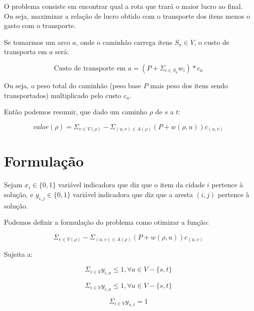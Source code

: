 \documentclass[conference]{IEEEtran}
\begin{document}
    O problema consiste em encontrar qual a rota que trará o maior lucro ao final. Ou seja, maximizar a relação de lucro obtido com o transporte dos itens menos o gasto com o transporte.

    Se tomarmos um arco $a$, onde o caminhão carrega itens $S_a \in V$, o custo de transporta em $a$ será:

    \begin{equation}
        \text{Custo de transporte em } a = (P + \Sigma_{i \in S_a} w_i) * c_a
    \end{equation}

    Ou seja, o peso total do caminhão (peso base $P$ mais peso dos itens sendo transportados) multiplicado pelo custo $c_a$.

    Então podemos resumir, que dado um caminho $\rho$ de $s$ a $t$:

    \begin{equation}
        valor(\rho) = \Sigma_{v \in V(\rho)} - \Sigma_{(u,v) \in A(\rho)} (P + w(\rho, u))c_{(u,v)}
    \end{equation}

\section {Formulação}

    Sejam $x_i \in \{0, 1\}$ variável indicadora que diz que o item da cidade $i$ pertence à solução, e $y_{i,j} \in \{0, 1\}$ variável indicadora que diz que a aresta $(i,j)$ pertence à solução.

    Podemos definir a formulação do problema como otimizar a função:

    \begin{equation}
        \Sigma_{v \in V(\rho)} - \Sigma_{(u,v) \in A(\rho)} (P + w(\rho, u))c_{(u,v)}
    \end{equation}


    Sujeita a:

    \begin{equation}
        \Sigma_{i \in V} y_{i,a} \leq 1, \forall a \in V - \{s,t\}
        \label{1}
    \end{equation}

    \begin{equation}
        \Sigma_{i \in V} y_{i,a} \leq 1, \forall a \in V - \{s,t\}
        \label{2}
    \end{equation}

    \begin{equation}
        \Sigma_{i \in V} y_{s,i} = 1
        \label{s-out}
    \end{equation}
\end{document}
